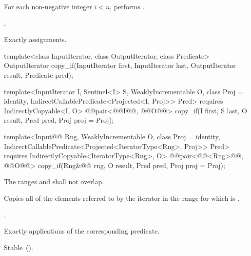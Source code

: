 \begin{itemdescr}
\pnum
\effects For each non-negative integer
$i < n$, performs .

\pnum
\returns {}.

\pnum
\complexity Exactly  assignments.
\end{itemdescr}

%
\begin{removedblock}
\begin{itemdecl}
template<class InputIterator, class OutputIterator, class Predicate>
  OutputIterator copy_if(InputIterator first, InputIterator last,
                         OutputIterator result, Predicate pred);
\end{itemdecl}
\end{removedblock}
\begin{addedblock}
\begin{itemdecl}
template<InputIterator I, Sentinel<I> S, WeaklyIncrementable O, class Proj = identity,
    IndirectCallablePredicate<Projected<I, Proj>> Pred>
  requires IndirectlyCopyable<I, O>
  @@pair<@@I@\newtxt{)}@, @@O@\newtxt{)}@>
    copy_if(I first, S last, O result, Pred pred, Proj proj = Proj{});

template<Input@@ Rng, WeaklyIncrementable O, class Proj = identity,
    IndirectCallablePredicate<Projected<IteratorType<Rng>, Proj>> Pred>
  requires IndirectlyCopyable<IteratorType<Rng>, O>
  @@pair<@@<Rng>@\newtxt{)}@, @@O@\newtxt{)}@>
    copy_if(Rng&@\newtxt{\&}@ rng, O result, Pred pred, Proj proj = Proj{});
\end{itemdecl}
\end{addedblock}

\begin{itemdescr}
\pnum
\requires The ranges  and  shall not overlap.

\pnum
\effects Copies all of the elements referred to by the iterator  in the range 
for which  is .

\pnum
\returns {}.

\pnum
\complexity Exactly  applications of the corresponding predicate.

\pnum
\remarks Stable~().
\end{itemdescr}


